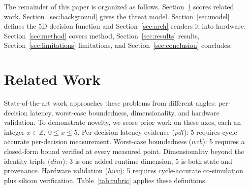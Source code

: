 \documentclass[conference]{IEEEtran}
\begin{document}

The remainder of this paper is organized as follows. Section~\ref{sec:related} scores related work. Section~\ref{sec:background} gives the threat model. Section~\ref{sec:model} defines the 5D decision function and Section~\ref{sec:arch} renders it into hardware. Section~\ref{sec:method} covers method, Section~\ref{sec:results} results, Section~\ref{sec:limitations} limitations, and Section~\ref{sec:conclusion} concludes.

\section{Related Work}
\label{sec:related}

State-of-the-art work approaches these problems from different angles: per-decision latency, worst-case boundedness, dimensionality, and hardware validation. To demonstrate novelty, we score prior work on these axes, each an integer $x \in \mathbb{Z},\ 0 \le x \le 5$. Per-decision latency evidence ($\mathit{pdl}$): 5 requires cycle-accurate per-decision measurement. Worst-case boundedness ($\mathit{wcb}$): 5 requires a closed-form bound verified at every measured point. Dimensionality beyond the identity triple ($\mathit{dim}$): 3 is one added runtime dimension, 5 is both state and provenance. Hardware validation ($\mathit{hwv}$): 5 requires cycle-accurate co-simulation plus silicon verification. Table~\ref{tab:rubric} applies these definitions. %
\end{document}
